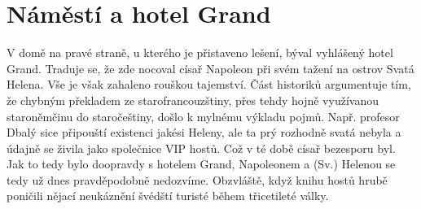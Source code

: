 
\chapter{Náměstí a hotel Grand}


V domě na pravé straně, u kterého je přistaveno lešení, býval vyhlášený hotel
Grand. Traduje se, že zde nocoval císař Napoleon při svém tažení na ostrov
Svatá Helena. Vše je však zahaleno rouškou tajemství. Část historiků
argumentuje tím, že chybným překladem ze starofrancouzštiny, přes tehdy hojně
využívanou staroněmčinu do staročeštiny, došlo k mylnému výkladu pojmů. Např.
profesor Dbalý sice připouští existenci jakési Heleny, ale ta prý rozhodně
svatá nebyla a údajně se živila jako společnice VIP hostů. Což v té době císař
bezesporu byl. Jak to tedy bylo doopravdy s hotelem Grand, Napoleonem a (Sv.)
Helenou se tedy už dnes pravděpodobně nedozvíme. Obzvláště, když knihu hostů
hrubě poničili nějací neukáznění švédští turisté během třicetileté války.

